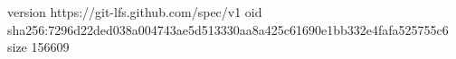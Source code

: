 version https://git-lfs.github.com/spec/v1
oid sha256:7296d22ded038a004743ae5d513330aa8a425c61690e1bb332e4fafa525755c6
size 156609
